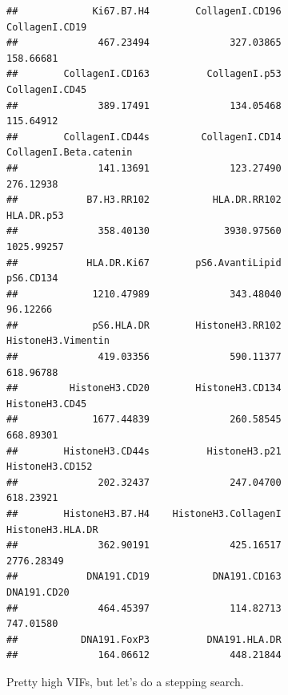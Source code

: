 \documentclass[a4paper]{article}\usepackage[]{graphicx}\usepackage[]{color}
\makeatletter
\newenvironment{kframe}{%
 \def\at@end@of@kframe{}%
 \ifinner\ifhmode%
  \def\at@end@of@kframe{\end{minipage}}%
  \begin{minipage}{\columnwidth}%
 \fi\fi%
 \def\FrameCommand##1{\hskip\@totalleftmargin \hskip-\fboxsep
 \colorbox{shadecolor}{##1}\hskip-\fboxsep
     \hskip-\linewidth \hskip-\@totalleftmargin \hskip\columnwidth}%
 \MakeFramed {\advance\hsize-\width
   \@totalleftmargin\z@ \linewidth\hsize
   \@setminipage}}%
 {\par\unskip\endMakeFramed%
 \at@end@of@kframe}
\newenvironment{knitrout}{}{} %
\makeatother
\begin{document}
\begin{knitrout}
\begin{kframe}
\begin{verbatim}
##             Ki67.B7.H4        CollagenI.CD196         CollagenI.CD19 
##              467.23494              327.03865              158.66681 
##        CollagenI.CD163          CollagenI.p53         CollagenI.CD45 
##              389.17491              134.05468              115.64912 
##        CollagenI.CD44s         CollagenI.CD14 CollagenI.Beta.catenin 
##              141.13691              123.27490              276.12938 
##            B7.H3.RR102           HLA.DR.RR102             HLA.DR.p53 
##              358.40130             3930.97560             1025.99257 
##            HLA.DR.Ki67        pS6.AvantiLipid              pS6.CD134 
##             1210.47989              343.48040               96.12266 
##             pS6.HLA.DR        HistoneH3.RR102     HistoneH3.Vimentin 
##              419.03356              590.11377              618.96788 
##         HistoneH3.CD20        HistoneH3.CD134         HistoneH3.CD45 
##             1677.44839              260.58545              668.89301 
##        HistoneH3.CD44s          HistoneH3.p21        HistoneH3.CD152 
##              202.32437              247.04700              618.23921 
##        HistoneH3.B7.H4    HistoneH3.CollagenI       HistoneH3.HLA.DR 
##              362.90191              425.16517             2776.28349 
##            DNA191.CD19           DNA191.CD163            DNA191.CD20 
##              464.45397              114.82713              747.01580 
##           DNA191.FoxP3          DNA191.HLA.DR 
##              164.06612              448.21844
\end{verbatim}
\end{kframe}
\end{knitrout}

Pretty high VIFs, but let's do a stepping search.
\end{document}
